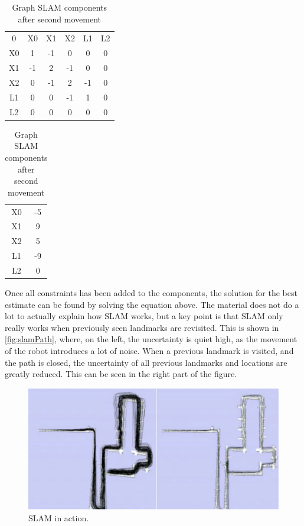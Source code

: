 \documentclass[Main]{subfiles}
\begin{document}
\begin{table}[H]
	\begin{subtable}{0.5\linewidth}
		\centering
	\begin{tabular}{cccccc}
		0 & X0 & X1 & X2 & L1 & L2 \\ 
		X0 & 1 & -1 & 0 & 0 & 0  \\ 
		X1 & -1 & 2 & -1 & 0 & 0  \\ 
		X2 & 0 & -1 & 2 & -1 & 0  \\  
		L1 & 0 & 0 & -1 & 1 & 0  \\ 
		L2 & 0 & 0 & 0 & 0 & 0  \\ 
	\end{tabular}
	\caption{$\Omega$ }
	\end{subtable}
	\begin{subtable}{0.5\linewidth}
		\centering
		\begin{tabular}{cc}
			X0 & -5 \\ 
			X1 & 9 \\ 
			X2 & 5 \\ 
			L1 & -9 \\  
			L2 & 0 \\ 
		\end{tabular}
	\caption{$\xi$}
	\end{subtable}
\caption{Graph SLAM components after second movement}
\label{table:secondmovement_graphslamtable} 
\end{table} \noindent

Once all constraints has been added to the components, the solution for the best estimate can be found by solving the equation above.
The material does not do a lot to actually explain how SLAM works, but a key point is that SLAM only really works when previously seen landmarks are revisited. 
This is shown in \autoref{fig:slamPath}, where, on the left, the uncertainty is quiet high, as the movement of the robot introduces a lot of noise.
When a previous landmark is visited, and the path is closed, the uncertainty of all previous landmarks and locations are greatly reduced. This can be seen in the right part of the figure.

\begin{figure}[H]
	\centering
	\includegraphics[width=0.9\linewidth]{./Figures/SLAMpath}
	\caption{SLAM in action.}
	\label{fig:slamPath}
\end{figure}\noindent
\end{document}
